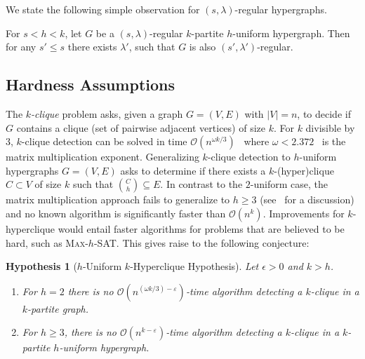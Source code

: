 \documentclass[a4paper,UKenglish,cleveref, autoref, thm-restate,numberwithinsect]{lipics-v2021}
\newcommand{\bigO}{\mathcal{O}}
\newcommand{\reg}{\lambda}
\newtheorem{hypothesis}[theorem]{Hypothesis}
\begin{document}
We state the following simple observation for $(s, \reg)$-regular hypergraphs.
\begin{observation}\label{obs:reguarity-of-smaller-arities}
    For $s<h<k$, let $G$ be a $(s, \reg)$-regular $k$-partite $h$-uniform hypergraph. Then for any $s'\leq s$ there exists $\reg'$, such that $G$ is also $(s', \reg')$-regular.
\end{observation}

\subsection{Hardness Assumptions}
The \emph{$k$-clique} problem asks, given a graph $G = (V,E)$ with $|V| = n$, to decide if $G$ contains a clique (set of pairwise adjacent vertices) of size $k$. For $k$ divisible by $3$, 
$k$-clique detection can be solved in time $\bigO(n^{\omega k/3})$~\cite{NesetrilP85} where $\omega < 2.372$~\cite{AlmanDWXXZ25} is the matrix multiplication exponent. 
Generalizing $k$-clique detection to $h$-uniform hypergraphs $G=(V,E)$ asks to determine if there exists a $k$-(hyper)clique $C \subset V$ of size $k$ such that $\binom{C}{h} \subseteq E$. In contrast to the $2$-uniform case, the matrix multiplication approach fails to generalize to $h\geq 3$ (see~\cite{LincolnWW18} for a discussion) and no known algorithm is significantly faster than $\bigO(n^k)$. 
Improvements for $k$-hyperclique would entail faster algorithms for problems that are believed to be hard, such as \textsc{Max-$h$-SAT}. 
This gives raise to the following conjecture:
\begin{hypothesis}[$h$-Uniform $k$-Hyperclique Hypothesis]
    Let $\epsilon > 0$ and $k > h$.
    \begin{enumerate}
        \item For $h = 2$ there is no $\bigO(n^{({\omega k}/{3}) - \varepsilon})$-time algorithm detecting a $k$-clique in a $k$-partite graph.
        \item For $h\geq 3$, there is no $\bigO(n^{k - \varepsilon})$-time algorithm detecting a $k$-clique in a $k$-partite $h$-uniform hypergraph.
    \end{enumerate}
\end{hypothesis}
\end{document}
